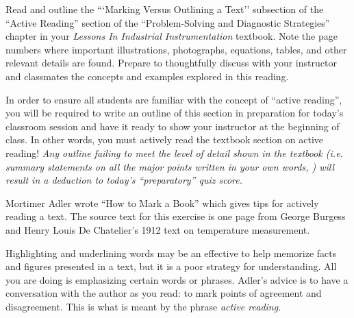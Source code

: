 

Read and outline the ```Marking Versus Outlining a Text'' subsection of the ``Active Reading'' section of the ``Problem-Solving and Diagnostic Strategies'' chapter in your {\it Lessons In Industrial Instrumentation} textbook.  Note the page numbers where important illustrations, photographs, equations, tables, and other relevant details are found.  Prepare to thoughtfully discuss with your instructor and classmates the concepts and examples explored in this reading.

\vskip 30pt

In order to ensure all students are familiar with the concept of ``active reading'', you will be required to write an outline of this section in preparation for today's classroom session and have it ready to show your instructor at the beginning of class.  In other words, you must actively read the textbook section on active reading!  {\it Any outline failing to meet the level of detail shown in the textbook (i.e. summary statements on all the major points written in your own words, ) will result in a deduction to today's ``preparatory'' quiz score.}














Mortimer Adler wrote ``How to Mark a Book'' which gives tips for actively reading a text.  The source text for this exercise is one page from George Burgess and Henry Louis De Chatelier's 1912 text on temperature measurement.

\vskip 10pt

Highlighting and underlining words may be an effective to help memorize facts and figures presented in a text, but it is a poor strategy for understanding.  All you are doing is emphasizing certain words or phrases.  Adler's advice is to have a conversation with the author as you read: to mark points of agreement and disagreement.  This is what is meant by the phrase {\it active reading}.  


